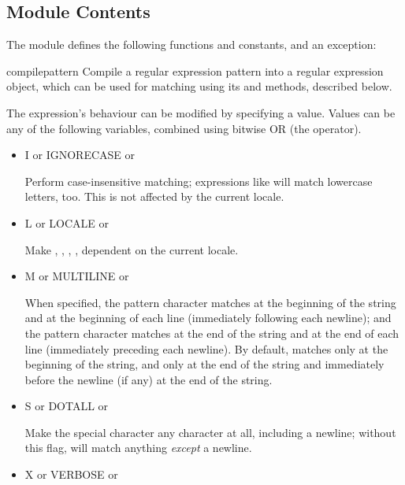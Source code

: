 \subsection{Module Contents}

The module defines the following functions and constants, and an exception:

\renewcommand{\indexsubitem}{(in module re)}

\begin{funcdesc}{compile}{pattern}
  Compile a regular expression pattern into a regular expression
  object, which can be used for matching using its  and
   methods, described below.  

  The expression's behaviour can be modified by specifying a
   value.  Values can be any of the following variables,
  combined using bitwise OR (the \code{|} operator).

\begin{itemize}

\item {I or IGNORECASE or }

{Perform case-insensitive matching; expressions like \code{[A-Z]} will match
lowercase letters, too.  This is not affected by the current locale.
}
\item {L or LOCALE or }

{Make , , ,
, dependent on the current locale. 
}

\item {M or MULTILINE or }

{When specified, the pattern character \code{\^} matches at the
  beginning of the string and at the beginning of each line
  (immediately following each newline); and the pattern character
\code{\$} matches at the end of the string and at the end of each line
(immediately preceding each newline).
By default, \code{\^} matches only at the beginning of the string, and
\code{\$} only at the end of the string and immediately before the
newline (if any) at the end of the string. 
}

\item {S or DOTALL or }

{Make the  special character any character at all, including a
newline; without this flag,  will match anything \emph{except}
a newline.} 

\item {X or VERBOSE or }


\end{itemize}
\end{funcdesc}
